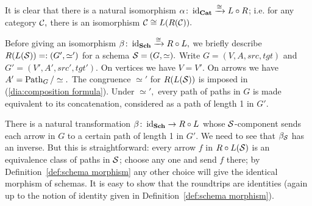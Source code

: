 \documentclass[../main/CT4S-EN-RU]{subfiles}
\begin{document}
\begin{proofENG}
It is clear that there is a natural isomorphism $\alpha\colon\operatorname{id}_{\mathbf{Cat}}\xrightarrow{\cong} L\circ R$; i.e. for any category $\mathcal{C},$ there is an isomorphism $\mathcal{C}\cong L(R(\mathcal{C})).$ 

Before giving an isomorphism $\beta\colon\operatorname{id}_{\mathbf{Sch}}\xrightarrow{\cong}R\circ L,$ we briefly describe $R(L(\mathcal{S}))=:(G',\simeq')$ for a schema $\mathcal{S}=(G,\simeq).$ Write $G=(V,A,src,tgt)$ and $G'=(V',A',src',tgt').$ On vertices we have $V=V'.$ On arrows we have $A'=\operatorname{Path}_G/\simeq.$ The congruence $\simeq'$ for $R(L(\mathcal{S}))$ is imposed in (\ref{dia:composition formula}). Under $\simeq',$ every path of paths in $G$ is made equivalent to its concatenation, considered as a path of length 1 in $G'.$ 

There is a natural transformation $\beta\colon\operatorname{id}_{\mathbf{Sch}}\rightarrow R\circ L$ whose $\mathcal{S}$-component sends each arrow in $G$ to a certain path of length 1 in $G'.$ We need to see that $\beta_\mathcal{S}$ has an inverse. But this is straightforward: every arrow $f$ in $R\circ L(\mathcal{S})$ is an  equivalence class of paths in $\mathcal{S}$; choose any one and send $f$ there; by Definition~\ref{def:schema morphism} any other choice will give the identical morphism of schemas. It is easy to show that the roundtrips are identities (again up to the notion of identity given in Definition~\ref{def:schema morphism}).
\end{proofENG}

\begin{proofRUS}
\end{proofRUS}
\end{document}
